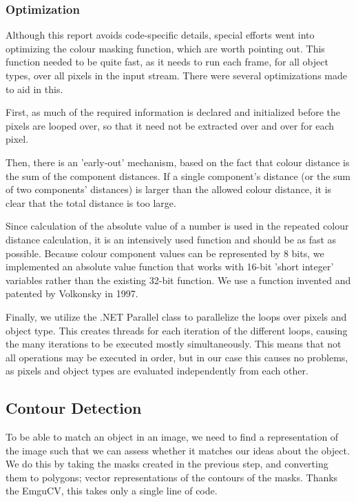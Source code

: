 \documentclass[10pt,twocolumn]{scrartcl}
\begin{document}
\subsubsection{Optimization}
Although this report avoids code-specific details, special efforts went into optimizing the colour masking function, which are worth pointing out. This function needed to be quite fast, as it needs to run each frame, for all object types, over all pixels in the input stream. There were several optimizations made to aid in this.

First, as much of the required information is declared and initialized before the pixels are looped over, so that it need not be extracted over and over for each pixel.

Then, there is an 'early-out' mechanism, based on the fact that colour distance is the sum of the component distances. If a single component's distance (or the sum of two components' distances) is larger than the allowed colour distance, it is clear that the total distance is too large.

Since calculation of the absolute value of a number is used in the repeated colour distance calculation, it is an intensively used function and should be as fast as possible. Because colour component values can be represented by 8 bits, we implemented an absolute value function that works with 16-bit 'short integer' variables rather than the existing 32-bit function. We use a function invented and patented by Volkonsky in 1997. %

Finally, we utilize the .NET Parallel class to parallelize the loops over pixels and object type. This creates threads for each iteration of the different loops, causing the many iterations to be executed mostly simultaneously. This means that not all operations may be executed in order, but in our case this causes no problems, as pixels and object types are evaluated independently from each other.

\subsection{Contour Detection}
To be able to match an object in an image, we need to find a representation of the image such that we can assess whether it matches our ideas about the object. We do this by taking the masks created in the previous step, and converting them to polygons; vector representations of the contours of the masks. Thanks the EmguCV, this takes only a single line of code.
\end{document}
